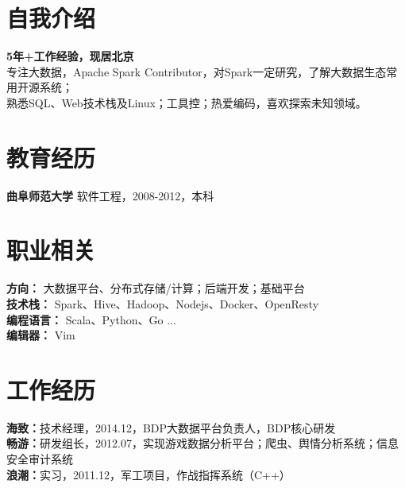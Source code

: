 \documentclass[UTF8,margin,line]{res}
\begin{document}

\begin{resume}

\section{\sc 自我介绍}
\textbf{5年+工作经验，现居北京} \\
专注大数据，Apache Spark Contributor，对Spark一定研究，了解大数据生态常用开源系统； \\
熟悉SQL、Web技术栈及Linux；工具控；热爱编码，喜欢探索未知领域。

\section{\sc 教育经历}
\textbf{曲阜师范大学} 软件工程，2008-2012，本科

\section{\sc 职业相关}
\textbf{方向：} 大数据平台、分布式存储/计算；后端开发；基础平台 \\
\textbf{技术栈：} Spark、Hive、Hadoop、Nodejs、Docker、OpenResty \\
\textbf{编程语言：} Scala、Python、Go ... \\
\textbf{编辑器：} Vim

\section{\sc 工作经历}
\textbf{海致：}技术经理，2014.12，BDP大数据平台负责人，BDP核心研发 \\
\textbf{畅游：}研发组长，2012.07，实现游戏数据分析平台；爬虫、舆情分析系统；信息安全审计系统 \\
\textbf{浪潮：}实习，2011.12，军工项目，作战指挥系统（C++）


\end{resume}
\end{document}
